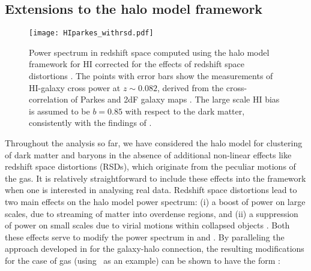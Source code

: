 
\subsection{Extensions to the halo model framework}
\label{sec:future}

\begin{figure}
\begin{center}
\texttt{[image: HIparkes\_withrsd.pdf]}
\caption{Power spectrum in redshift space computed using the halo model framework for HI corrected for the effects of redshift space distortions . The points with error bars show the measurements of HI-galaxy cross power at $z \sim 0.082$, derived from the cross-correlation of Parkes and 2dF galaxy maps \cite{anderson2018}. The large scale HI bias is  assumed to be $b = 0.85$ with respect to the dark matter, consistently with the findings of \cite{martin12}.}
\end{center}
\label{fig:hiparkeswithrsd}
\end{figure}


Throughout the analysis so far, we have considered the halo model for clustering of dark matter and baryons in the absence of additional non-linear effects like redshift space distortions (RSDs), which originate from the peculiar motions of the gas. It is relatively straightforward to include these effects into the framework when one is interested in analysing real data. Redshift space distortions lead to two main effects on the halo model power spectrum: (i) a boost of power on large scales, due to streaming of matter into overdense regions, and (ii) a suppression of power on small scales due to virial motions within collapsed objects \cite{Kaiser:1987qv, peacock1994}. Both these effects serve to modify the power spectrum in  and . By paralleling the approach developed in \cite{seljak2001, white2001} for the galaxy-halo connection, the resulting modifications for the case of gas (using \HI\ as an example) can be shown to have the form :


